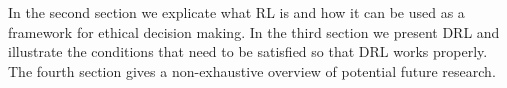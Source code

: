 
In the second section we explicate what RL is and how it can be used as a framework for ethical decision making. In the third section we present DRL and illustrate the conditions that need to be satisfied so that DRL works properly. The fourth section gives a non-exhaustive overview of potential future research. 
